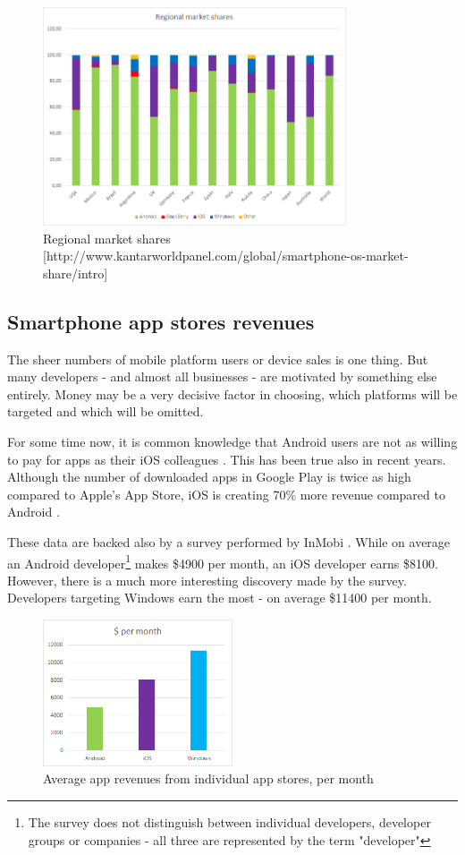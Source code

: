 \documentclass[english,master,public,dept460,male,cpdeclaration,oneside]{diploma}
\begin{document}
\begin{figure}
	\centering\includegraphics[width=0.8\textwidth]{Figures/regionalMarketShares.png}
	\caption{Regional market shares [http://www.kantarworldpanel.com/global/smartphone-os-market-share/intro]}
\end{figure}

\subsection{Smartphone app stores revenues}
The sheer numbers of mobile platform users or device sales is one thing. But many developers - and almost all businesses - are motivated by something else entirely. Money may be a very decisive factor in choosing, which platforms will be targeted and which will be omitted. 

For some time now, it is common knowledge that Android users are not as willing to pay for apps as their iOS colleagues \cite{iosUsersPay}. This has been true also in recent years. Although the number of downloaded apps in Google Play is twice as high compared to Apple’s App Store, iOS is creating 70\% more revenue compared to Android \cite{iosAndroidStore}. 

These data are backed also by a survey performed by InMobi \cite{lifehackerRevenues}. While on average an Android developer\footnote{The survey does not distinguish between individual developers, developer groups or companies - all three are represented by the term "developer"} makes \$4900 per month, an iOS developer earns \$8100. However, there is a much more interesting discovery made by the survey. Developers targeting Windows earn the most - on average \$11400 per month.

\begin{figure}
	\centering\includegraphics[width=0.5\textwidth]{Figures/appRevenues.png}
	\caption{Average app revenues from individual app stores, per month}
\end{figure}
\end{document}

